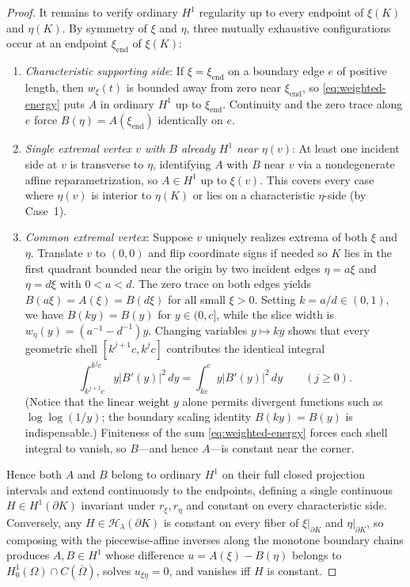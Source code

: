 \documentclass[11pt,reqno]{amsart}
\theoremstyle{definition}
\theoremstyle{remark}
\begin{document}
\begin{proof}
It remains to verify ordinary $H^1$ regularity up to every endpoint of $\xi(K)$ and $\eta(K)$. By symmetry of $\xi$ and $\eta$, three mutually exhaustive configurations occur at an endpoint $\xi_{\mathrm{end}}$ of $\xi(K)$:
\begin{enumerate}
  \item \emph{Characteristic supporting side}: If $\xi = \xi_{\mathrm{end}}$ on a boundary edge $e$ of positive length, then $w_\xi(t)$ is bounded away from zero near $\xi_{\mathrm{end}}$, so \eqref{eq:weighted-energy} puts $A$ in ordinary $H^1$ up to $\xi_{\mathrm{end}}$. Continuity and the zero trace along $e$ force $B(\eta) = A(\xi_{\mathrm{end}})$ identically on $e$.
  \item \emph{Single extremal vertex $v$ with $B$ already $H^1$ near $\eta(v)$}: At least one incident side at $v$ is transverse to $\eta$, identifying $A$ with $B$ near $v$ via a nondegenerate affine reparametrization, so $A \in H^1$ up to $\xi(v)$. This covers every case where $\eta(v)$ is interior to $\eta(K)$ or lies on a characteristic $\eta$-side (by Case~1).
  \item \emph{Common extremal vertex}: Suppose $v$ uniquely realizes extrema of both $\xi$ and $\eta$. Translate $v$ to $(0,0)$ and flip coordinate signs if needed so $K$ lies in the first quadrant bounded near the origin by two incident edges $\eta = a\xi$ and $\eta = d\xi$ with $0 < a < d$. The zero trace on both edges yields $B(a\xi) = A(\xi) = B(d\xi)$ for all small $\xi > 0$. Setting $k = a/d \in (0,1)$, we have $B(ky) = B(y)$ for $y \in (0,c]$, while the slice width is $w_\eta(y) = (a^{-1} - d^{-1})y$. Changing variables $y \mapsto ky$ shows that every geometric shell $[k^{j+1}c, k^j c]$ contributes the identical integral
  \[
    \int_{k^{j+1}c}^{k^j c} y |B'(y)|^2 \, dy = \int_{kc}^{c} y |B'(y)|^2 \, dy \qquad (j \ge 0).
  \]
  (Notice that the linear weight $y$ alone permits divergent functions such as $\log\log(1/y)$; the boundary scaling identity $B(ky) = B(y)$ is indispensable.) Finiteness of the sum \eqref{eq:weighted-energy} forces each shell integral to vanish, so $B$---and hence $A$---is constant near the corner.
\end{enumerate}
Hence both $A$ and $B$ belong to ordinary $H^1$ on their full closed projection intervals and extend continuously to the endpoints, defining a single continuous $H \in H^1(\partial K)$ invariant under $r_\xi, r_\eta$ and constant on every characteristic side. Conversely, any $H \in \mathcal{H}_\lambda(\partial K)$ is constant on every fiber of $\xi|_{\partial K}$ and $\eta|_{\partial K}$, so composing with the piecewise-affine inverses along the monotone boundary chains produces $A, B \in H^1$ whose difference $u = A(\xi) - B(\eta)$ belongs to $H_0^1(\Omega) \cap C(\overline{\Omega})$, solves $u_{\xi\eta} = 0$, and vanishes iff $H$ is constant.
\end{proof}
\end{document}
